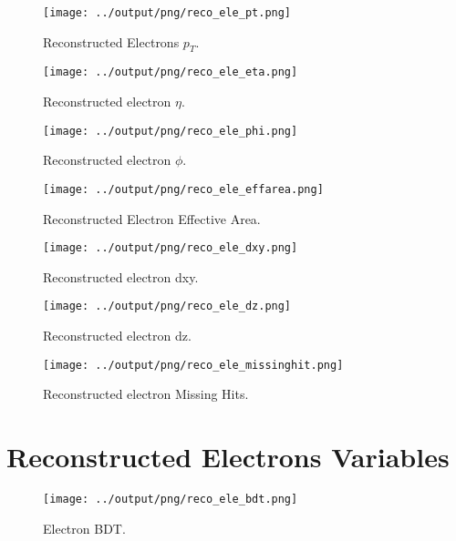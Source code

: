 \documentclass[11pt]{book}
\begin{document}
\begin{figure}[htb]
\centering
\texttt{[image: ../output/png/reco\_ele\_pt.png]}
\caption{Reconstructed Electrons $p_{T}$.}
\label{fig:reco_ele_pt}
\end{figure}

\begin{figure}[htb]
\centering
\texttt{[image: ../output/png/reco\_ele\_eta.png]}
\caption{Reconstructed electron $\eta$.}
\label{fig:reco_ele_eta}
\end{figure}

\begin{figure}[htb]
\centering
\texttt{[image: ../output/png/reco\_ele\_phi.png]}
\caption{Reconstructed electron $\phi$.}
\label{fig:reco_ele_phi}
\end{figure}

\begin{figure}[htb]
\centering
\texttt{[image: ../output/png/reco\_ele\_effarea.png]}
\caption{Reconstructed Electron Effective Area.}
\label{fig:reco_ele_effarea}
\end{figure}

\begin{figure}[htb]
\centering
\texttt{[image: ../output/png/reco\_ele\_dxy.png]}
\caption{Reconstructed electron dxy.}
\label{fig:reco_ele_dxy}
\end{figure}

\begin{figure}[htb]
\centering
\texttt{[image: ../output/png/reco\_ele\_dz.png]}
\caption{Reconstructed electron dz.}
\label{fig:reco_ele_dz}
\end{figure}

\begin{figure}[htb]
\centering
\texttt{[image: ../output/png/reco\_ele\_missinghit.png]}
\caption{Reconstructed electron Missing Hits.}
\label{fig:reco_ele_missinghit}
\end{figure}
\clearpage

\section{Reconstructed Electrons Variables}
\begin{figure}[htb]
\centering
\texttt{[image: ../output/png/reco\_ele\_bdt.png]}
\caption{Electron BDT.}
\label{fig:reco_ele_bdt}
\end{figure}
\end{document}
